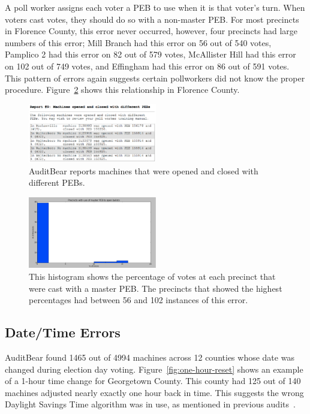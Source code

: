 \documentclass[letterpaper,twocolumn,10pt]{article}
\begin{document}
A poll worker assigns each voter a PEB to use when it is that voter's turn. When 
voters cast votes, they should do so with a non-master PEB. For most precincts
in Florence County, this error never occurred, however, four precincts had large
numbers of this error; Mill Branch had  
this error on 56 out of 540 votes, Pamplico 2 had this error on 82 out of 579 
votes, McAllister Hill had this error on 102 out of 749 votes, and Effingham 
had this error on 86 out of 591 votes. This pattern of errors again suggests
certain pollworkers did not know the proper
procedure. Figure~\ref{fig:master-peb-activated}  
shows this relationship in Florence County. 

\begin{figure}[htbp]
\begin{center}
    \includegraphics[width=0.5\textwidth,height=0.2\textheight]{OpenClosePEBs.eps}
\end{center}
\caption{AuditBear reports machines that were opened and closed with different PEBs.}
\label{fig:diff-pebs-open-close}
\end{figure}

\begin{figure}[htbp]
\begin{center}
    \includegraphics[width=0.5\textwidth,height=0.4\textheight]{PEBactivateHist.eps}
\end{center}
\caption{This histogram shows the percentage of votes at each precinct that were 
cast with a master PEB.  The precincts that showed the highest percentages had 
between 56 and 102 instances of this error.}
\label{fig:master-peb-activated}
\end{figure}

\subsection{Date/Time Errors}
 AuditBear found 1465 out of 4994 machines across 12 counties whose date was
 changed during election day voting. Figure~\ref{fig:one-hour-reset} shows an
 example of a 1-hour time change for Georgetown County. This county had 125 out
 of 140 machines adjusted nearly exactly one hour back in time. This suggests
 the wrong Daylight Savings Time algorithm was in use, as mentioned in previous
 audits~\cite{Buell2011}.
\end{document}
